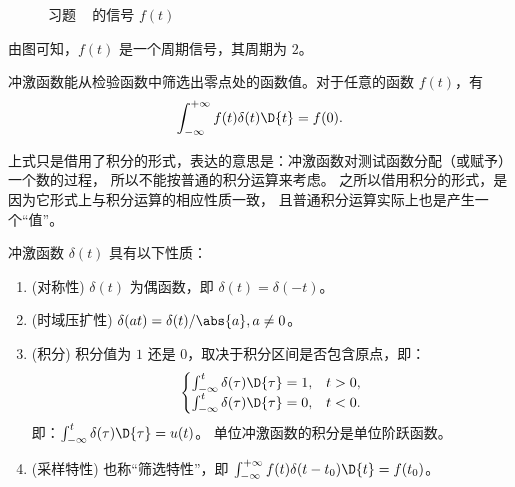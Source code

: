 \begin{solution}
\begin{figure}[H]
        \caption{习题 \theexercise~ 的信号 $f(t)$}
        \label{fig:chap1-part5-exercise1-solution}
    \end{figure}
    由图可知，$f(t)$ 是一个周期信号，其周期为 $2$。
\end{solution}

\begin{property}[从函数到值的映射关系]
    冲激函数能从检验函数中筛选出零点处的函数值。对于任意的函数 $f(t)$，有
    \begin{align*}
        \int_{-\infty}^{+\infty}f(t)\delta(t)\D{t} = f(0).
    \end{align*}

    上式只是借用了积分的形式，表达的意思是：冲激函数对测试函数分配（或赋予）一个数的过程，
    所以不能按普通的积分运算来考虑。
    之所以借用积分的形式，是因为它形式上与积分运算的相应性质一致，
    且普通积分运算实际上也是产生一个``值''。
\end{property}

\begin{property}[冲激函数的性质总结]
    冲激函数 $\delta(t)$ 具有以下性质：
    \begin{enumerate}
        \item (对称性) $\delta(t)$ 为偶函数，即 $\delta(t) = \delta(-t)$。
        \item (时域压扩性) $\delta(at) = \delta(t) / \abs{a}, a \neq 0$。
        \item (积分) 积分值为 $1$ 还是 $0$，取决于积分区间是否包含原点，即：
            \begin{align*}
                \begin{cases}
                    \int_{-\infty}^{t}\delta(\tau)\D{\tau} = 1, & t > 0, \\
                    \int_{-\infty}^{t}\delta(\tau)\D{\tau} = 0, & t < 0.
                \end{cases}
            \end{align*}
            即：$\int_{-\infty}^{t}\delta(\tau)\D{\tau} = u(t)$。
            单位冲激函数的积分是单位阶跃函数。
        \item (采样特性) 也称``筛选特性''，即 $\int_{-\infty}^{+\infty}f(t)\delta(t - t_0)\D{t} = f(t_0)$。
    \end{enumerate}
\end{property}

